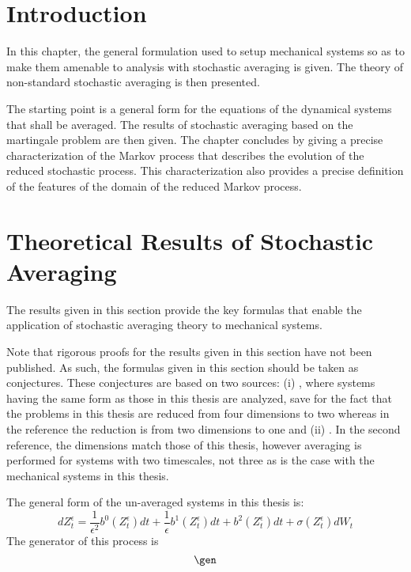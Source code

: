 \section{Introduction}

In this chapter, the general formulation used to setup mechanical systems so as to make them amenable to analysis with stochastic averaging is given. The theory of non-standard stochastic averaging is then presented.

The starting point is a general form for the equations of the dynamical systems that shall be averaged. The results of stochastic averaging based on the martingale problem are then given. The chapter concludes by giving a precise characterization of the Markov process that describes the evolution of the reduced stochastic process. This characterization also provides a precise definition of the features of the domain of the reduced Markov process.



\section{Theoretical Results of Stochastic Averaging}

The results given in this section provide the key formulas that enable the application of stochastic averaging theory to mechanical systems.

Note that rigorous proofs for the results given in this section have not been published. As such, the formulas given in this section should be taken as conjectures. These conjectures are based on two sources: (i) \citet{namachchivaya01:_unified_approac_noisy_nonlin_mathieu_type_system}, where systems having the same form as those in this thesis are analyzed, save for the fact that the problems in this thesis are reduced from four dimensions to two whereas in the reference the reduction is from two dimensions to one and (ii) \citet{freidlin04:_diffus}. In the second reference, the dimensions match those of this thesis, however averaging is performed for systems with two timescales, not three as is the case with the mechanical systems in this thesis.

The general form of the un-averaged systems in this thesis is:
\[
dZ_t^\epsilon = \frac{1}{\epsilon^2} b^0(Z_t^\epsilon) dt + \frac{1}{\epsilon} b^1(Z_t^\epsilon) dt + b^2(Z_t^\epsilon) dt + \sigma(Z_t^\epsilon) dW_t
\]
The generator of this process is
\[
\gen
\]
